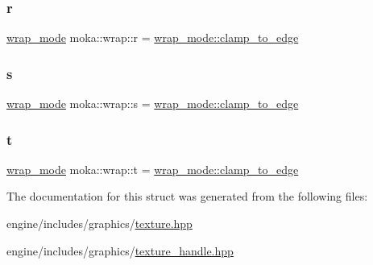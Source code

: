 \subsubsection{\texorpdfstring{r}{r}}
{\footnotesize\ttfamily \mbox{\hyperlink{namespacemoka_afda3faa87bacaacc6008d8c1f73f6462}{wrap\+\_\+mode}} moka\+::wrap\+::r = \mbox{\hyperlink{namespacemoka_afda3faa87bacaacc6008d8c1f73f6462a7ff5ead6fef18ca5f63119754ac76c3e}{wrap\+\_\+mode\+::clamp\+\_\+to\+\_\+edge}}}

\mbox{\label{structmoka_1_1wrap_a703a73b99bf23cc13a933f553c17e7a6}} 
\subsubsection{\texorpdfstring{s}{s}}
{\footnotesize\ttfamily \mbox{\hyperlink{namespacemoka_afda3faa87bacaacc6008d8c1f73f6462}{wrap\+\_\+mode}} moka\+::wrap\+::s = \mbox{\hyperlink{namespacemoka_afda3faa87bacaacc6008d8c1f73f6462a7ff5ead6fef18ca5f63119754ac76c3e}{wrap\+\_\+mode\+::clamp\+\_\+to\+\_\+edge}}}

\mbox{\label{structmoka_1_1wrap_aba660a44454afab7048d2b79a6e68f35}} 
\subsubsection{\texorpdfstring{t}{t}}
{\footnotesize\ttfamily \mbox{\hyperlink{namespacemoka_afda3faa87bacaacc6008d8c1f73f6462}{wrap\+\_\+mode}} moka\+::wrap\+::t = \mbox{\hyperlink{namespacemoka_afda3faa87bacaacc6008d8c1f73f6462a7ff5ead6fef18ca5f63119754ac76c3e}{wrap\+\_\+mode\+::clamp\+\_\+to\+\_\+edge}}}



The documentation for this struct was generated from the following files\+:\begin{DoxyCompactItemize}
\item 
engine/includes/graphics/\mbox{\hyperlink{texture_8hpp}{texture.\+hpp}}\item 
engine/includes/graphics/\mbox{\hyperlink{texture__handle_8hpp}{texture\+\_\+handle.\+hpp}}\end{DoxyCompactItemize}
